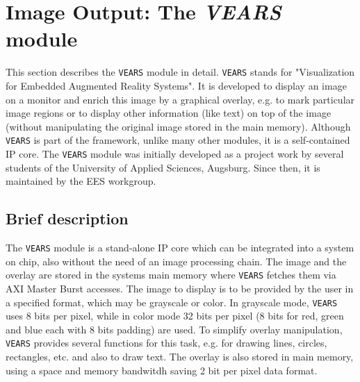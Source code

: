 






\section{Image Output: The \textit{VEARS} module} 
\label{ch:07-modules-vears}

\bigskip

This section describes the \texttt{VEARS} module in detail.
\texttt{VEARS} stands for "Visualization for Embedded Augmented Reality Systems". It is developed to display an image on a monitor and enrich this image by a graphical overlay, e.g. to mark particular image regions or to display other information (like text) on top of the image (without manipulating the original image stored in the main memory).
Although \texttt{VEARS} is part of the \asterics framework, unlike many other \asterics modules, it is a self-contained IP core. 
The \texttt{VEARS} module was initially developed as a project work by several students of the University of Applied Sciences, Augsburg. Since then, it is maintained by the EES workgroup. 


\subsection{Brief description}

The \texttt{VEARS} module is a stand-alone IP core which can be integrated into a system on chip, also without the need of an \asterics image processing chain. 
The image and the overlay are stored in the systems main memory where \texttt{VEARS} fetches them via AXI Master Burst accesses. The image to display is to be provided by the user in a specified format, which may be grayscale or color. In grayscale mode, \texttt{VEARS} uses 8 bits per pixel, while in color mode 32 bits per pixel (8 bits for red, green and blue each with 8 bits padding) are used. To simplify overlay manipulation, \texttt{VEARS} provides several functions for this task, e.g. for drawing lines, circles, rectangles, etc. and also to draw text. The overlay is also stored in main memory, using a space and memory bandwitdh saving 2 bit per pixel data format.





